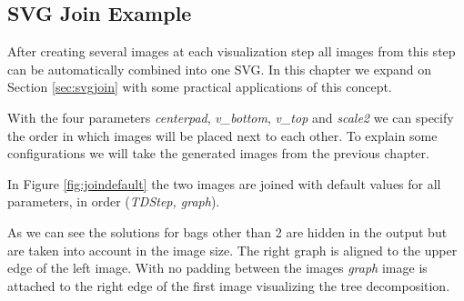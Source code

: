 \documentclass[a4paper, 12pt, bibliography=totoc]{scrartcl}
\begin{document}
\subsection{SVG Join Example}

After creating several images at each visualization step all images from this step can be automatically combined into one SVG. In this chapter we expand on Section \ref{sec:svgjoin} with some practical applications of this concept.

With the four parameters \textit{centerpad}, \textit{v\_bottom}, \textit{v\_top} and \textit{scale2} we can specify the order in which images will be placed next to each other. To explain some configurations we will take the generated images from the previous chapter.

In Figure \ref{fig:joindefault} the two images are joined with default values for all parameters, in order (\textit{TDStep, graph}). 

As we can see the solutions for bags other than 2 are hidden in the output but are taken into account in the image size. The right graph is aligned to the upper edge of the left image. With no padding between the images \textit{graph} image is attached to the right edge of the first image visualizing the {tree decomposition}.
\end{document}
